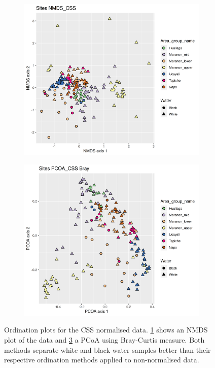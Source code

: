 \begin{figure}[h]
	\centering
	\begin{subfigure}{0.4\textwidth}
		\centering
		\includegraphics[width = \textwidth]{nmds12otucss}
		\caption{}
		\label{fig:nmds12otucss}
	\end{subfigure}
	\begin{subfigure}{0.4\textwidth}
		\centering
		\includegraphics[width = \textwidth]{pcoa12otucss}
		\caption{}
		\label{fig:pcoa12otucss}
	\end{subfigure}
	\caption{Ordination plots for the CSS normalised data. \ref{fig:nmds12otucss} shows an NMDS plot of the data and \ref{fig:pcoa12otucss} a PCoA using Bray-Curtis measure. Both methods separate white and black water samples better than their respective ordination methods applied to non-normalised data.}
\end{figure}

